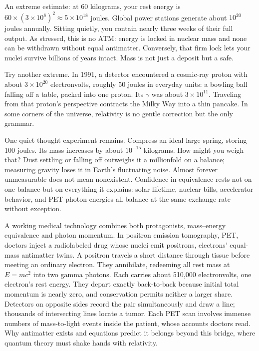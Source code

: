 
\begin{thought}
An extreme estimate: at 60 kilograms, your rest energy is \(60\times(3\times10^{8})^{2}\approx5\times10^{18}\) joules. Global power stations generate about \(10^{20}\) joules annually. Sitting quietly, you contain nearly three weeks of their full output. As stressed, this is no ATM: energy is locked in nuclear mass and none can be withdrawn without equal antimatter. Conversely, that firm lock lets your nuclei survive billions of years intact. Mass is not just a deposit but a safe.

Try another extreme. In 1991, a detector encountered a cosmic-ray proton with about \(3\times10^{20}\) electronvolts, roughly 50 joules in everyday units: a bowling ball falling off a table, packed into one proton. Its \(\gamma\) was about \(3\times10^{11}\). Traveling from that proton's perspective contracts the Milky Way into a thin pancake. In some corners of the universe, relativity is no gentle correction but the only grammar.

One quiet thought experiment remains. Compress an ideal large spring, storing 100 joules. Its mass increases by about \(10^{-15}\) kilograms. How might you weigh that? Dust settling or falling off outweighs it a millionfold on a balance; measuring gravity loses it in Earth's fluctuating noise. Almost forever unmeasurable does not mean nonexistent. Confidence in equivalence rests not on one balance but on everything it explains: solar lifetime, nuclear bills, accelerator behavior, and PET photon energies all balance at the same exchange rate without exception.
\end{thought}

\begin{mainline}
A working medical technology combines both protagonists, mass--energy equivalence and photon momentum. In positron emission tomography, PET, doctors inject a radiolabeled drug whose nuclei emit positrons, electrons' equal-mass antimatter twins. A positron travels a short distance through tissue before meeting an ordinary electron. They annihilate, redeeming all rest mass at \(E=mc^{2}\) into two gamma photons. Each carries about 510,000 electronvolts, one electron's rest energy. They depart exactly back-to-back because initial total momentum is nearly zero, and conservation permits neither a larger share. Detectors on opposite sides record the pair simultaneously and draw a line; thousands of intersecting lines locate a tumor. Each PET scan involves immense numbers of mass-to-light events inside the patient, whose accounts doctors read. Why antimatter exists and equations predict it belongs beyond this bridge, where quantum theory must shake hands with relativity.
\end{mainline}

